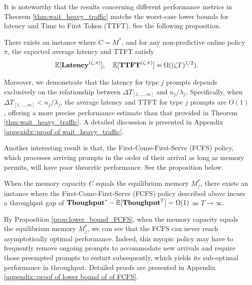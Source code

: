 It is noteworthy that the results concerning different performance metrics in Theorem \ref{thm:wait_heavy_traffic} matche the worst-case lower bounds for latency and Time to First Token (TTFT). See the following proposition.
\begin{proposition}\label{prop::simple random walk, tight bound}
There exists an instance where \( C = M^* \), and for any non-predictive online policy \(\pi\), the expected average latency and TTFT satisfy
\[
\mathbb{E}[\textbf{Latency}^{(\zeta,\pi)}],\quad \mathbb{E}[\textbf{TTFT}^{(\zeta,\pi)}] = \Omega((\zeta T)^{1/2}).
\]
\end{proposition}
Moreover, we demonstrate that the latency for type \( j \) prompts depends exclusively on the relationship between \(\Delta T_{[1,\dots,m]}\) and $n_j/\lambda_j$. Specifically, when \(\Delta T_{[1,\dots,m]} < n_j/\lambda_j\), the average latency and TTFT for type \( j \) prompts are \( O(1) \), offering a more precise performance estimate than that provided in Theorem \ref{thm:wait_heavy_traffic}. A detailed discussion is presented in Appendix \ref{appexidx::proof of wait_heavy_traffic}.

Another interesting result is that, the First-Come-First-Serve (FCFS) policy, which processes arriving prompts in the order of their arrival as long as memory permits, will have poor theoretic performance. See the proposition below.
\begin{proposition}\label{prop:lower_bound_FCFS}
When the memory capacity \(C\) equals the equilibrium memory \(M_j^*\), there exists an instance where the First-Come-First-Serve (FCFS) policy described above incurs a throughput gap of \(\textbf{Thoughput}^* - \mathbb{E}[\textbf{Thoughput}^T] = \Omega(1)\) as \(T \to \infty\).
\end{proposition}
By Proposition \ref{prop:lower_bound_FCFS}, when the memory capacity equals the equilibrium memory \(M_j^*\), we can see that the FCFS can never reach asymptotically optimal performance. Indeed, this myopic policy may have to frequently remove ongoing prompts to accommodate new arrivals and require those preempted prompts to restart subsequently, which yields its sub-optimal performance in throughput. Detailed proofs are presented in Appendix \ref{appendix::proof of lower bound of of FCFS}.


